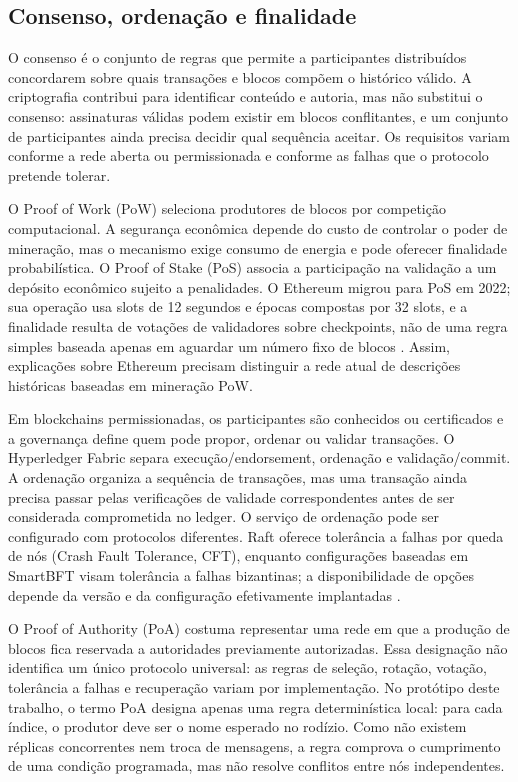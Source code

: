 \documentclass[10pt,a4paper,twocolumn]{article}
\begin{document}
\subsection{Consenso, ordenação e finalidade}
O consenso é o conjunto de regras que permite a participantes distribuídos concordarem sobre quais transações e blocos compõem o histórico válido. A criptografia contribui para identificar conteúdo e autoria, mas não substitui o consenso: assinaturas válidas podem existir em blocos conflitantes, e um conjunto de participantes ainda precisa decidir qual sequência aceitar. Os requisitos variam conforme a rede aberta ou permissionada e conforme as falhas que o protocolo pretende tolerar.

O Proof of Work (PoW) seleciona produtores de blocos por competição computacional. A segurança econômica depende do custo de controlar o poder de mineração, mas o mecanismo exige consumo de energia e pode oferecer finalidade probabilística. O Proof of Stake (PoS) associa a participação na validação a um depósito econômico sujeito a penalidades. O Ethereum migrou para PoS em 2022; sua operação usa slots de 12 segundos e épocas compostas por 32 slots, e a finalidade resulta de votações de validadores sobre checkpoints, não de uma regra simples baseada apenas em aguardar um número fixo de blocos \cite{EthereumDocs}. Assim, explicações sobre Ethereum precisam distinguir a rede atual de descrições históricas baseadas em mineração PoW.

Em blockchains permissionadas, os participantes são conhecidos ou certificados e a governança define quem pode propor, ordenar ou validar transações. O Hyperledger Fabric separa execução/endorsement, ordenação e validação/commit. A ordenação organiza a sequência de transações, mas uma transação ainda precisa passar pelas verificações de validade correspondentes antes de ser considerada comprometida no ledger. O serviço de ordenação pode ser configurado com protocolos diferentes. Raft oferece tolerância a falhas por queda de nós (Crash Fault Tolerance, CFT), enquanto configurações baseadas em SmartBFT visam tolerância a falhas bizantinas; a disponibilidade de opções depende da versão e da configuração efetivamente implantadas \cite{Androulaki2018,FabricDocs}.

O Proof of Authority (PoA) costuma representar uma rede em que a produção de blocos fica reservada a autoridades previamente autorizadas. Essa designação não identifica um único protocolo universal: as regras de seleção, rotação, votação, tolerância a falhas e recuperação variam por implementação. No protótipo deste trabalho, o termo PoA designa apenas uma regra determinística local: para cada índice, o produtor deve ser o nome esperado no rodízio. Como não existem réplicas concorrentes nem troca de mensagens, a regra comprova o cumprimento de uma condição programada, mas não resolve conflitos entre nós independentes.
\end{document}
